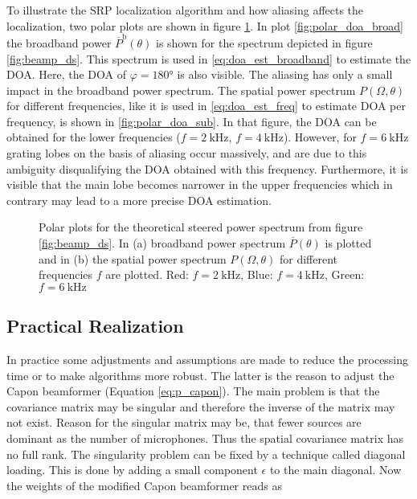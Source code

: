 To illustrate the \ac{SRP} localization algorithm and how aliasing affects the localization, two polar plots are shown in figure \ref{fig:polar_doa}. In plot \ref{fig:polar_doa_broad} the broadband power $\overline{P}^\text{b}(\theta)$ is shown for the spectrum depicted in figure \ref{fig:beamp_ds}. This spectrum is used in \ref{eq:doa_est_broadband} to estimate the \ac{DOA}. Here, the \ac{DOA} of $\varphi = \ang{180}$ is also visible. The aliasing has only a small impact in the broadband power spectrum. The spatial power spectrum $P(\Omega, \theta)$ for different frequencies, like it is used in \ref{eq:doa_est_freq} to estimate \ac{DOA} per frequency, is shown in \ref{fig:polar_doa_sub}. In that figure, the \ac{DOA} can be obtained for the lower frequencies ($f = \SI{2}{\kilo \Hz}$, $f = \SI{4}{\kilo \Hz}$). However, for $f = \SI{6}{\kilo \Hz}$ grating lobes on the basis of aliasing occur massively, and are due to this ambiguity disqualifying the \ac{DOA} obtained with this frequency. Furthermore, it is visible that the main lobe becomes narrower in the upper frequencies which in contrary may lead to a more precise \ac{DOA} estimation.


\begin{figure}[!ht]
	\hfill
	\caption{Polar plots for the theoretical steered power spectrum from figure \ref{fig:beamp_ds}. In (a) broadband power spectrum $\overline{P}(\theta)$ is plotted and in (b) the spatial power spectrum $P(\Omega,\theta)$ for different frequencies $f$ are plotted.
	Red: $f = \SI{2}{\kilo \Hz}$, Blue: $f = \SI{4}{\kilo \Hz}$, Green: $f = \SI{6}{\kilo \Hz}$}
	\label{fig:polar_doa}
\end{figure}



\subsection{Practical Realization}
\label{subsec:prac_real}
In practice some adjustments and assumptions are made to reduce the processing time or to make algorithms more robust. The latter is the reason to adjust the Capon beamformer (Equation \ref{eq:p_capon}). The main problem is that the covariance matrix may be singular and therefore the inverse of the matrix may not exist. Reason for the singular matrix may be, that fewer sources are dominant as the number of microphones. Thus the spatial covariance matrix has no full rank. The singularity problem can be fixed by a technique called diagonal loading. This is done by adding a small component $\epsilon$ to the main diagonal. Now the weights of the modified Capon beamformer reads as

